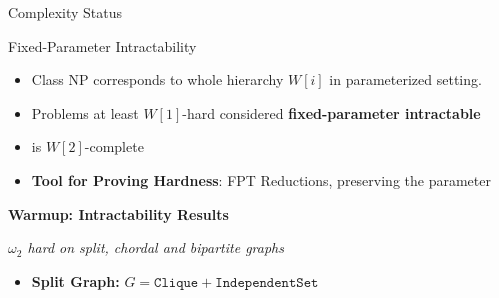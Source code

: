 \begin{frame}[c]{Complexity Status}
 \begin{figure}
    \centering

    \makeatletter
    \resizebox{0.7\textwidth}{!}{
        
    }
    \makeatother
\end{figure}
\end{frame}



\begin{frame}[c]{Fixed-Parameter Intractability}
    \begin{itemize}
        \item  Class NP corresponds to whole hierarchy $W[i]$ in parameterized setting.
        \item Problems at least $W[1]$-hard considered \textbf{fixed-parameter intractable}
        \item \dom is $W[2]$-complete
        \item \textbf{Tool for Proving Hardness}: FPT Reductions, preserving the parameter
    \end{itemize}

\end{frame}


\begin{frame}[c]{}
    \begin{center}
        \textbf{Warmup: Intractability Results}

        \textit{$\omega_2$ hard on split, chordal and bipartite graphs}
    \end{center}

    \begin{itemize}
        \item \textbf{Split Graph:} $G = \mathtt{Clique} + \mathtt{Independent Set}$
    \end{itemize}

\end{frame}

